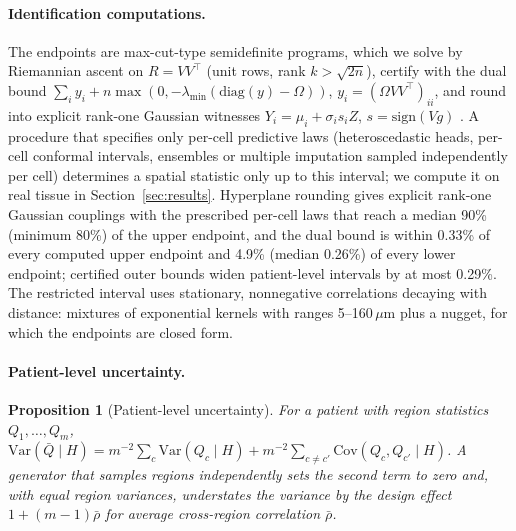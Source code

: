 \documentclass[10pt,letterpaper]{article}
\newtheorem{proposition}{Proposition}
\theoremstyle{definition}
\theoremstyle{remark}
\newcommand{\Var}{\mathrm{Var}}
\newcommand{\Cov}{\mathrm{Cov}}
\begin{document}
\paragraph{Identification computations.} The endpoints are max-cut-type semidefinite programs, which we solve by Riemannian ascent on $R=VV^\top$ \citep{boumal2016} (unit rows, rank $k>\sqrt{2n}$), certify with the dual bound $\sum_iy_i+n\max(0,-\lambda_{\min}(\mathrm{diag}(y)-\Omega))$, $y_i=(\Omega VV^\top)_{ii}$, and round into explicit rank-one Gaussian witnesses $Y_i=\mu_i+\sigma_is_iZ$, $s=\mathrm{sign}(Vg)$ \citep{goemans1995}. A procedure that specifies only per-cell predictive laws (heteroscedastic heads, per-cell conformal intervals, ensembles or multiple imputation sampled independently per cell) determines a spatial statistic only up to this interval; we compute it on real tissue in Section~\ref{sec:results}. Hyperplane rounding gives explicit rank-one Gaussian couplings with the prescribed per-cell laws that reach a median 90\% (minimum 80\%) of the upper endpoint, and the dual bound is within 0.33\% of every computed upper endpoint and 4.9\% (median 0.26\%) of every lower endpoint; certified outer bounds widen patient-level intervals by at most 0.29\%. The restricted interval uses stationary, nonnegative correlations decaying with distance: mixtures of exponential kernels with ranges 5--160\,$\mu$m plus a nugget, for which the endpoints are closed form.

\paragraph{Patient-level uncertainty.}
\begin{proposition}[Patient-level uncertainty]\label{prop:deff}
For a patient with region statistics $Q_1,\dots,Q_m$, $\Var(\bar Q\mid H)=m^{-2}\sum_c\Var(Q_c\mid H)+m^{-2}\sum_{c\ne c'}\Cov(Q_c,Q_{c'}\mid H)$. A generator that samples regions independently sets the second term to zero and, with equal region variances, understates the variance by the design effect $1+(m-1)\bar\rho$ for average cross-region correlation $\bar\rho$.
\end{proposition}
\end{document}
